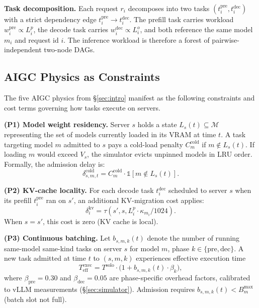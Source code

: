 \textbf{Task decomposition.} Each request $r_i$ decomposes into
two tasks $(t^{\text{pre}}_i, t^{\text{dec}}_i)$ with a strict
dependency edge $t^{\text{pre}}_i \to t^{\text{dec}}_i$. The
prefill task carries workload
$w^{\text{pre}}_i \propto L^p_i$, the decode task carries
$w^{\text{dec}}_i \propto L^o_i$, and both reference the same
model $m_i$ and request id $i$. The inference workload is
therefore a forest of pairwise-independent two-node DAGs.

\subsection{AIGC Physics as Constraints}
\label{sec:physics-constraints}

The five AIGC physics from \S\ref{sec:intro} manifest as the
following constraints and cost terms governing how tasks
execute on servers.

\textbf{(P1) Model weight residency.} Server $s$ holds a state
$L_s(t) \subseteq \mathcal{M}$ representing the set of models
currently loaded in its VRAM at time $t$. A task targeting
model $m$ admitted to $s$ pays a cold-load penalty
$C^{\text{cold}}_m$ if $m \notin L_s(t)$. If loading $m$ would
exceed $V_s$, the simulator evicts unpinned models in LRU
order. Formally, the admission delay is:
\begin{equation}
  \delta^{\text{cold}}_{s,m,t} = C^{\text{cold}}_m \cdot
    \mathbb{1}[m \notin L_s(t)].
\end{equation}

\textbf{(P2) KV-cache locality.} For each decode task
$t^{\text{dec}}_i$ scheduled to server $s$ when its prefill
$t^{\text{pre}}_i$ ran on $s'$, an additional KV-migration
cost applies:
\begin{equation}
  \delta^{\text{kv}}_i = \tau\!\left(s', s,
    L^p_i \cdot \kappa_{m_i} / 1024\right).
\end{equation}
When $s = s'$, this cost is zero (KV cache is local).

\textbf{(P3) Continuous batching.} Let $b_{s,m,k}(t)$ denote
the number of running same-model same-kind tasks on server $s$
for model $m$, phase $k \in \{\text{pre}, \text{dec}\}$. A new
task admitted at time $t$ to $(s, m, k)$ experiences effective
execution time
\begin{equation}
  T^{\text{exec}}_{\text{eff}}
    = T^{\text{solo}} \cdot
      \bigl(1 + b_{s,m,k}(t) \cdot \beta_k\bigr),
\end{equation}
where $\beta_{\text{pre}} = 0.30$ and
$\beta_{\text{dec}} = 0.05$ are phase-specific overhead
factors, calibrated to vLLM measurements
(\S\ref{sec:simulator}).
Admission requires $b_{s,m,k}(t) < B^{\max}_m$ (batch slot not
full).

